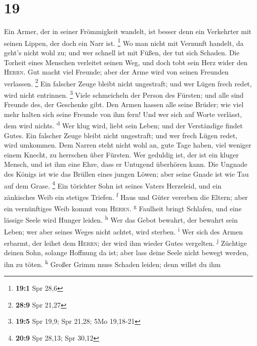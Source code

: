 \hypertarget{section-18}{%
\section{19}\label{section-18}}

 Ein Armer, der in seiner Frömmigkeit wandelt, ist besser
denn ein Verkehrter mit seinen Lippen, der doch ein Narr ist.
\footnote{\textbf{19:1} Spr 28,6}  Wo man nicht mit
Vernunft handelt, da geht's nicht wohl zu; und wer schnell ist mit
Füßen, der tut sich Schaden.  Die Torheit eines Menschen
verleitet seinen Weg, und doch tobt sein Herz wider den \textsc{Herrn}.
 Gut macht viel Freunde; aber der Arme wird von seinen
Freunden verlassen. \footnote{\textbf{28:9} Spr 21,27} 
Ein falscher Zeuge bleibt nicht ungestraft; und wer Lügen frech redet,
wird nicht entrinnen. \footnote{\textbf{19:5} Spr 19,9; Spr 21,28; 5Mo
  19,18-21}  Viele schmeicheln der Person des Fürsten; und
alle sind Freunde des, der Geschenke gibt.  Den Armen
hassen alle seine Brüder; wie viel mehr halten sich seine Freunde von
ihm fern! Und wer sich auf Worte verlässt, dem wird nichts.
\textsuperscript{d}  Wer klug wird, liebt sein Leben; und
der Verständige findet Gutes.  Ein falscher Zeuge bleibt
nicht ungestraft; und wer frech Lügen redet, wird umkommen.
 Dem Narren steht nicht wohl an, gute Tage haben, viel
weniger einem Knecht, zu herrschen über Fürsten.  Wer
geduldig ist, der ist ein kluger Mensch, und ist ihm eine Ehre, dass er
Untugend überhören kann.  Die Ungnade des Königs ist wie
das Brüllen eines jungen Löwen; aber seine Gnade ist wie Tau auf dem
Grase. \footnote{\textbf{20:9} Spr 28,13; Spr 30,12}  Ein
törichter Sohn ist seines Vaters Herzeleid, und ein zänkisches Weib ein
stetiges Triefen. \textsuperscript{f}  Haus und Güter
vererben die Eltern; aber ein vernünftiges Weib kommt vom
\textsc{Herrn}. \textsuperscript{g}  Faulheit bringt
Schlafen, und eine lässige Seele wird Hunger leiden. \textsuperscript{h}
 Wer das Gebot bewahrt, der bewahrt sein Leben; wer aber
seines Weges nicht achtet, wird sterben. \textsuperscript{i}
 Wer sich des Armen erbarmt, der leihet dem
\textsc{Herrn}; der wird ihm wieder Gutes vergelten. \textsuperscript{j}
 Züchtige deinen Sohn, solange Hoffnung da ist; aber lass
deine Seele nicht bewegt werden, ihn zu töten. \textsuperscript{k}
 Großer Grimm muss Schaden leiden; denn willst du ihm
